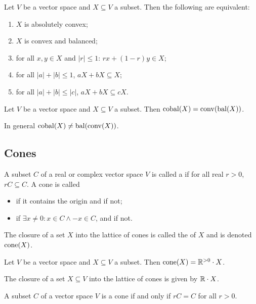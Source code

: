 \begin{lemma} \label{absolutelyConvexCriteria}
Let $V$ be a vector space and $X\subseteq V$ a subset. Then the following are equivalent:
\begin{enumerate}
\item $X$ is absolutely convex;
\item $X$ is convex and balanced;
\item for all $x,y\in X$ and $|r| \leq 1$:  $rx + (1-r)y\in X$;
\item for all $|a|+|b| \leq 1$, $aX +bX \subseteq X$;
\item for all $|a|+|b| \leq |c|$, $aX +bX \subseteq cX$.
\end{enumerate}
\end{lemma}

\begin{lemma}
Let $V$ be a vector space and $X\subseteq V$ a subset. Then $\operatorname{cobal}(X) = \operatorname{conv}(\operatorname{bal}(X))$.
\end{lemma}
In general $\operatorname{cobal}(X) \neq \operatorname{bal}(\operatorname{conv}(X))$.



\subsection{Cones}
\begin{definition}
A subset $C$ of a real or complex vector space $V$ is called a  if for all real $r>0$, $rC \subseteq C$. A cone is called
\begin{itemize}
\item {} if it contains the origin and  if not;
\item {} if $\exists x\neq 0: x\in C \land -x\in C$, and  if not.
\end{itemize}
The closure of a set $X$ into the lattice of cones is called the  of $X$ and is denoted $\operatorname{cone}(X)$.
\end{definition}

\begin{lemma}
Let $V$ be a vector space and $X\subseteq V$ a subset. Then $\operatorname{cone}(X) = \mathbb{R}^{> 0}\cdot X$.
\end{lemma}

The closure of a set $X\subseteq V$ into the lattice of cones is given by $\mathbb{R}\cdot X$.

\begin{lemma} \label{coneEqualityLemma}
A subset $C$ of a vector space $V$ is a cone \textup{if and only if} $rC = C$ for all $r> 0$.
\end{lemma}

